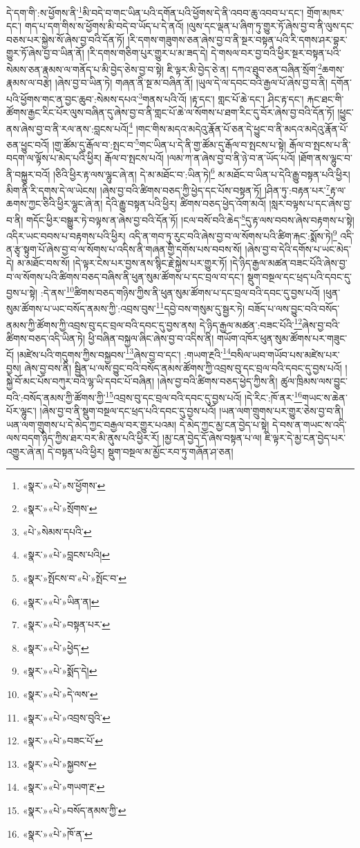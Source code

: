 དེ་དག་གི་:ས་ཕྱོགས་ནི་\footnote{«སྣར་»«པེ་»ས་ཕྱོགས་}མི་བདེ་བ་གང་ཡིན་པའི་དགོན་པའི་ཕྱོགས་དེ་ནི་འབབ་ཆུ་འབབ་པ་དང་། གྲོག་མཁར་དང་། གད་པ་དག་གིས་ས་ཕྱོགས་མི་བདེ་བ་ཡོད་པ་དེ་ནའོ། །ལུས་དང་ལྡན་པ་ཞིག་ཏུ་གྱུར་ཏོ་ཞེས་བྱ་བ་ནི་ལུས་དང་བཅས་པར་སྐྱེས་སོ་ཞེས་བྱ་བའི་དོན་ཏོ། །རི་དགས་གཟུགས་ཅན་ཞེས་བྱ་བ་ནི་སྔར་བསྟན་པའི་རི་དགས་ཤར་བྷར་གྱུར་ཏོ་ཞེས་བྱ་བ་ཡིན་ནོ། །རི་དགས་གཅིག་པུར་གྱུར་པ་མ་ཟད་དེ། དེ་གསལ་བར་བྱ་བའི་ཕྱིར་སྔར་བསྟན་པའི་སེམས་ཅན་རྣམས་ལ་གནོད་པ་མི་བྱེད་ཅེས་བྱ་བ་སྟེ། ཇི་ལྟར་མི་བྱེད་ཅེ་ན། དཀའ་ཐུབ་ཅན་བཞིན་སྲོག་\footnote{«སྣར་»«པེ་»སྲོགས་}ཆགས་རྣམས་ལ་བརྩེ། །ཞེས་བྱ་བ་ཡིན་ཏེ། གཞན་ནི་སྔ་མ་བཞིན་ནོ། །ཡུལ་དེ་ལ་དབང་བའི་རྒྱལ་པོ་ཞེས་བྱ་བ་ནི། དགོན་པའི་ཕྱོགས་གང་ན་བྱང་ཆུབ་:སེམས་དཔའ་\footnote{«པེ་»སེམས་དཔའི་}གནས་པའི་འོ། །རྟ་དང་། གླང་པོ་ཆེ་དང་། ཤིང་རྟ་དང་། རྐང་ཐང་གི་ཚོགས་རྒྱང་རིང་པོར་ལུས་བཞིན་དུ་ཞེས་བྱ་བ་ནི་གླང་པོ་ཆེ་ལ་སོགས་པ་ཐག་རིང་དུ་བོར་ཞེས་བྱ་བའི་དོན་ཏོ། །ཕྱུང་ནས་ཞེས་བྱ་བ་ནི་རལ་ནས་:བླངས་པའོ།\footnote{«སྣར་»«པེ་»བླངས་པའི།} །གང་གིས་མདའ་མདེའུ་རྣོན་པོ་ཅན་དེ་ཕྱུང་བ་ནི་མདའ་མདེའུ་རྣོན་པོ་ཅན་ཕྱུང་བའོ། །གྱ་ཚོམ་དུ་རྒོལ་བ་:སྤང་བ་\footnote{«སྣར་»སྤོངས་བ་«པེ་»སྤོང་བ་}གང་ཡིན་པ་དེ་ནི་གྱ་ཚོམ་དུ་རྒོལ་བ་སྤངས་པ་སྟེ། རྒོལ་བ་སྤངས་པ་ནི་བདག་ལ་ལྟོས་པ་མེད་པའི་ཕྱིར། རྒོལ་བ་སྤངས་པའོ། །ལམ་ཀ་ན་ཞེས་བྱ་བ་ནི་ཉེ་བ་ན་ཡོད་པའོ། །ཐོག་ནས་ལྷུང་བ་ནི་བསྐྱུར་བའོ། །ཅིའི་ཕྱིར་རྟ་ལས་ལྷུང་ཞེ་ན། དེ་མ་མཐོང་བ་:ཡིན་ཏེ།\footnote{«སྣར་»«པེ་»ཡིན་ན།} མ་མཐོང་བ་ཡིན་པ་དེའི་རྒྱུ་བསྟན་པའི་ཕྱིར། མིག་ནི་རི་དགས་དེ་ལ་ཡེངས། །ཞེས་བྱ་བའི་ཚིགས་བཅད་ཀྱི་ཕྱེད་དང་པོས་བསྟན་ཏོ། །ཤིན་ཏུ་:བརྟན་པར་\footnote{«སྣར་»«པེ་»བསྟན་པར་}རྟ་ལ་ཆགས་ཀྱང་ཅིའི་ཕྱིར་ལྷུང་ཞེ་ན། དེའི་རྒྱུ་བསྟན་པའི་ཕྱིར། ཚིགས་བཅད་ཕྱེད་འོག་མའོ། །སླར་བལྟས་པ་དང་ཞེས་བྱ་བ་ནི། གདོང་ཕྱིར་བསྒྱུར་ཏེ་བལྟས་ན་ཞེས་བྱ་བའི་དོན་ཏོ། །ངལ་བསོ་བའི་ཆེད་\footnote{«སྣར་»«པེ་»ཕྱེད་}དུ་རྟ་ལས་བབས་ཞེས་བརྟགས་པ་སྟེ། འདིར་ཡང་བབས་པ་བརྟགས་པའི་ཕྱིར། འདི་ན་གབ་ཏུ་རུང་བའི་ཞེས་བྱ་བ་ལ་སོགས་པའི་ཚིག་རྐང་:སྨོས་ཏེ།\footnote{«སྣར་»«པེ་»སྨོད་དེ།} འདི་ན་རྩྭ་སྟུག་པོ་ཞེས་བྱ་བ་ལ་སོགས་པ་འདིས་ནི་གཞན་གྱི་དགོས་པས་བབས་སོ། །ཞེས་བྱ་བ་དེའི་དགོས་པ་ཡང་མེད་དེ། མ་མཐོང་བས་སོ། །དེ་ལྟར་ངེས་པར་བྱས་ནས་སྙིང་རྗེ་སྐྱེས་པར་གྱུར་ཏོ། །དེ་ཉིད་རྒྱལ་མཚན་བཟང་པོའི་ཞེས་བྱ་བ་ལ་སོགས་པའི་ཚིགས་བཅད་བཞིས་ནི་ཕུན་སུམ་ཚོགས་པ་དང་བྲལ་བ་དང་། སྡུག་བསྔལ་དང་ཕྲད་པའི་དབང་དུ་བྱས་པ་སྟེ། :དེ་ནས་\footnote{«སྣར་»«པེ་»དེ་ལས་}ཚིགས་བཅད་གཉིས་ཀྱིས་ནི་ཕུན་སུམ་ཚོགས་པ་དང་བྲལ་བའི་དབང་དུ་བྱས་པའོ། །ཕུན་སུམ་ཚོགས་པ་ཡང་བསོད་ནམས་ཀྱི་:འབྲས་བུས་\footnote{«སྣར་»«པེ་»འབྲས་བུའི་}དབྱེ་བས་གསུམ་དུ་སྦྱར་ཏེ། བཟོད་པ་ལས་བྱུང་བའི་བསོད་ནམས་ཀྱི་ཚོགས་ཀྱི་འབྲས་བུ་དང་བྲལ་བའི་དབང་དུ་བྱས་ནས། དེ་ཉིད་རྒྱལ་མཚན་:བཟང་པོའི་\footnote{«སྣར་»«པེ་»བཟང་པོ་}ཞེས་བྱ་བའི་ཚིགས་བཅད་འདི་ཡིན་ཏེ། ཕྱི་བཞིན་བསྐྱལ་ཞིང་ཞེས་བྱ་བ་འདིས་ནི། གཡོག་འཁོར་ཕུན་སུམ་ཚོགས་པར་གཟུང་ངོ། །མཛེས་པའི་གདུགས་ཀྱིས་བསྐྱབས་\footnote{«སྣར་»«པེ་»སྐྱབས་}ཞེས་བྱ་བ་དང་། :གཡག་རྔའི་\footnote{«སྣར་»«པེ་»གཡག་རྔ་}བསིལ་ཡབ་གཡོབ་པས་མཛེས་པར་བྱས། ཞེས་བྱ་བས་ནི། སྦྱིན་པ་ལས་བྱུང་བའི་བསོད་ནམས་ཚོགས་ཀྱི་འབྲས་བུ་དང་བྲལ་བའི་དབང་དུ་བྱས་པའོ། །སྐྱེ་བོ་མང་པོས་བཀུར་བའི་ལྷ་ཡི་དབང་པོ་བཞིན། །ཞེས་བྱ་བའི་ཚིགས་བཅད་ཕྱེད་ཀྱིས་ནི། ཚུལ་ཁྲིམས་ལས་བྱུང་བའི་:བསོད་ནམས་ཀྱི་ཚོགས་ཀྱི་\footnote{«སྣར་»«པེ་»བསོད་ནམས་ཀྱི་}འབྲས་བུ་དང་བྲལ་བའི་དབང་དུ་བྱས་པའོ། །དེ་རིང་:ཁོ་ནར་\footnote{«སྣར་»«པེ་»ཁོ་ན་}གཡང་ས་ཆེན་པོར་ལྷུང་། །ཞེས་བྱ་བ་ནི་སྡུག་བསྔལ་དང་ཕྲད་པའི་དབང་དུ་བྱས་པའོ། །ཡན་ལག་གྲུགས་པར་གྱུར་ཅེས་བྱ་བ་ནི། ཡན་ལག་གྲུགས་པ་དེ་མེད་ཀྱང་བརྒྱལ་བར་གྱུར་པའམ། དེ་མེད་ཀྱང་མྱ་ངན་བྱེད་པ་སྟེ། དེ་བས་ན་གཡང་ས་འདི་ལས་བདག་ཉིད་ཀྱིས་ཐར་བར་མི་ནུས་པའི་ཕྱིར་རོ། །མྱ་ངན་བྱེད་དོ་ཞེས་བསྟན་པ་ལ། ཇི་ལྟར་དེ་མྱ་ངན་བྱེད་པར་འགྱུར་ཞེ་ན། དེ་བསྟན་པའི་ཕྱིར། སྡུག་བསྔལ་མ་མྱོང་རབ་ཏུ་གཞོན་ཤ་ཅན། 